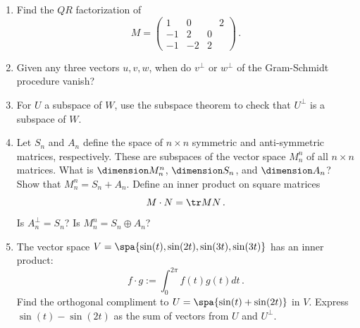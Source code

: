 \begin{enumerate}
\begin{enumerate}
\item Repeat the previous problem, but with three independent vectors $u,v,w$
 where $v^\perp$ and $w^\perp$ are as defined by the Gram-Schmidt procedure. 
\end{enumerate}



\item \label{QRprob} Find the $QR$ factorization of
\[
M=\begin{pmatrix}1&0&\phantom{\!-}2\\-1&2&0\\-1&-2&2
\end{pmatrix}\, .
\]


\item Given any three vectors $u,v,w$, when do $v^\perp$ or $w^\perp$ of the Gram-Schmidt procedure vanish?


\item For $U$ a subspace of $W$, use the subspace theorem to check that $U^\perp$ is a subspace of $W$.




\item %
Let $S_n$ and $A_n$ define the space of $n \times n$ symmetric and anti-symmetric matrices, respectively. These are subspaces of the vector space $M^n_n$ of all $n\times n$ matrices. What is $\dimension M^n_n$, $\dimension S_n$, and $\dimension A_n$? Show that $M^n_n = S_n + A_n$. Define an inner product on square matrices
\[
M\cdot N =\tr MN\, .
\]
Is $A_n^{\perp}=S_n$? Is $M^n_n = S_n \oplus A_n$?


\item The vector space $V=\spa\{ \sin(t),\sin(2t), \sin(3t) , \sin(3t)\}$ has an inner product: 
\[f\cdot g:=\int _0^{2\pi}f(t)g(t) dt\, .\] Find the orthogonal compliment to $U=\spa\{ \sin(t)+\sin(2t) \}$ in $V$. Express $\sin(t)-\sin(2t)$ as  the sum of vectors from $U$ and $U^\perp$.

\end{enumerate}

